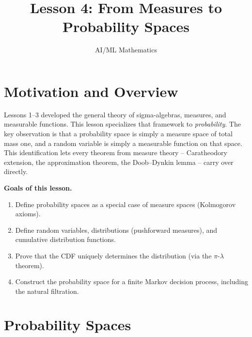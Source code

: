 \documentclass[11pt,a4paper]{article}
\title{Lesson 4: From Measures to Probability Spaces}
\author{AI/ML Mathematics}
\date{}
\begin{document}
\maketitle
\tableofcontents
\newpage


\section{Motivation and Overview}
\label{sec:motivation}

Lessons 1--3 developed the general theory of sigma-algebras, measures, and
measurable functions. This lesson specializes that framework to
\emph{probability}. The key observation is that a probability space is
simply a measure space of total mass one, and a random variable is simply a
measurable function on that space. This identification lets every theorem
from measure theory -- Caratheodory extension, the approximation theorem,
the Doob--Dynkin lemma -- carry over directly.

\medskip\noindent\textbf{Goals of this lesson.}
\begin{enumerate}[nosep]
  \item Define probability spaces as a special case of measure spaces
    (Kolmogorov axioms).
  \item Define random variables, distributions (pushforward measures), and
    cumulative distribution functions.
  \item Prove that the CDF uniquely determines the distribution
    (via the $\pi$-$\lambda$ theorem).
  \item Construct the probability space for a finite Markov decision process,
    including the natural filtration.
\end{enumerate}


\section{Probability Spaces}
\label{sec:prob_spaces}
\end{document}
